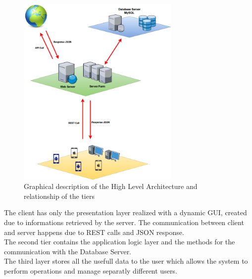 \documentclass[numbers=noenddot, 12pt, a4paper, oneside]{scrbook}
\begin{document}
\begin{figure}[H]
	\centering
	\includegraphics[width=0.7\textwidth]{images/HighLevelArchitecture}
	\caption{Graphical description of the High Level Architecture and relationship of the tiers}
\end{figure}

The client has only the presentation layer realized with a dynamic GUI, created due to informations retrieved by the server. The communication between client and server happens due to REST calls and JSON response.\\

The second tier contains the application logic layer and the methods for the communication with the Database Server.\\

The third layer stores all the usefull data to the user which allows the system to perform operations and manage separatly different users.
\end{document}
